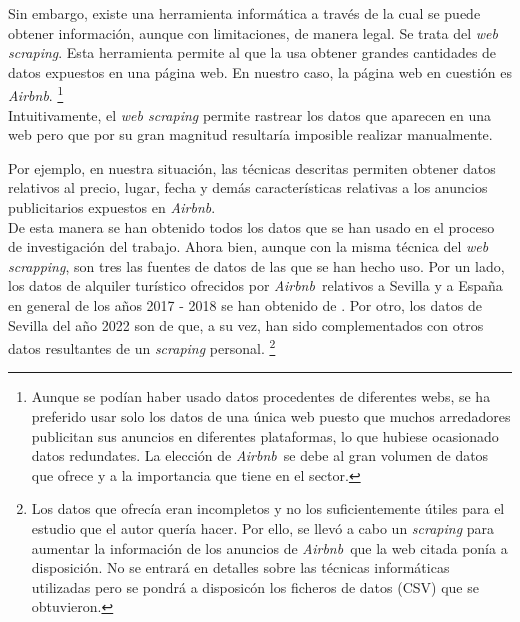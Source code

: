 \documentclass[a4paper,10pt]{article}
\newcommand*{\airbnb}{\textit{Airbnb}}
\newcommand*{\webscrapping}{\textit{web scrapping}}
\begin{document}
\begin{multicols}{2}
            \noindent
            Sin embargo, existe una herramienta informática a través de la cual se puede obtener información, aunque con limitaciones, de manera legal.
            Se trata del \textit{web scraping}. Esta herramienta permite al que la usa obtener grandes cantidades de datos expuestos en una página web.
            En nuestro caso, la página web en cuestión es \textit{Airbnb}. \footnote{Aunque se podían haber usado datos procedentes de diferentes webs, 
            se ha preferido usar solo los datos de una única web puesto que muchos arredadores publicitan sus anuncios en diferentes plataformas, lo que hubiese 
            ocasionado datos redundates. La elección de \airbnb \ se debe al gran volumen de datos que ofrece y a la importancia que tiene en el sector.} \\
           
            \noindent
            Intuitivamente, el \textit{web scraping} permite rastrear los datos que aparecen 
            en una web pero que por su gran magnitud resultaría imposible realizar manualmente. 
            \vfill\null
            
            \columnbreak
            \noindent
            Por ejemplo, en nuestra situación, las técnicas descritas 
            permiten obtener datos relativos al precio, lugar, fecha y demás características relativas a los anuncios publicitarios expuestos en \airbnb. \\
        
            \noindent
            De esta manera se han obtenido todos los datos que se han usado en el proceso de investigación del trabajo. Ahora bien, aunque con la misma técnica
            del \webscrapping, son tres las fuentes de datos de las que se han hecho uso. Por un lado, los datos de alquiler turístico ofrecidos por 
            \airbnb \  relativos a Sevilla y a España en general de los años 2017 - 2018 se han obtenido de \cite{datahippo}. Por otro, los datos 
            de Sevilla del año 2022 son de \cite{insideairbnb} que, a su vez, han sido complementados con otros datos resultantes de un \textit{scraping} personal.
            \footnote{Los datos que ofrecía \cite{insideairbnb} eran incompletos y no los suficientemente útiles para el estudio que el autor quería hacer. Por ello,
            se llevó a cabo un \textit{scraping} para aumentar la información de los anuncios de \airbnb \ que la web citada ponía a disposición. No se 
            entrará en detalles sobre las técnicas informáticas utilizadas pero se pondrá a disposicón los ficheros de datos (CSV) que se obtuvieron.} 


\end{multicols}
\end{document}
